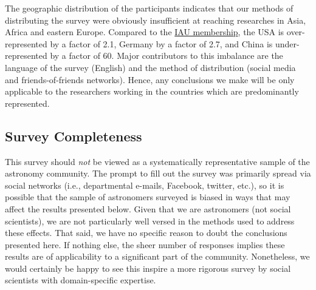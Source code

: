 The geographic distribution of the participants indicates that our methods of distributing the survey were obviously insufficient at reaching researches in Asia, Africa and eastern Europe. Compared to the \href{http://www.iau.org/administration/membership/individual/distribution/}{IAU membership}, the USA is over-represented by a factor of 2.1, Germany by a factor of 2.7, and China is under-represented by a factor of 60. Major contributors to this imbalance are the language of the survey (English) and the method of distribution (social media and friends-of-friends networks). Hence, any conclusions we make will be only applicable to the researchers working in the countries which are predominantly represented.

\subsection{Survey Completeness}

This survey should \emph{not} be viewed as a systematically representative sample of the astronomy community.  
The prompt to fill out the survey was primarily spread via social networks (i.e., departmental e-mails, Facebook, twitter, etc.), so it is possible that the sample of astronomers surveyed is biased in ways that may affect the results presented below.
Given that we are astronomers (not social scientists), we are not particularly well versed in the methods used to address these effects.
That said, we have no specific reason to doubt the conclusions presented here.  If nothing else, the sheer number of responses implies these results are of applicability to a significant part of the community.
Nonetheless, we would certainly be happy to see this inspire a more rigorous survey by social scientists with domain-specific expertise.
